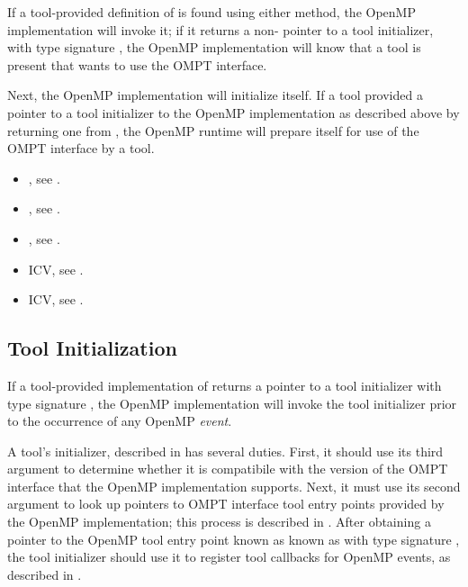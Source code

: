 If a tool-provided definition of  is found using
either method, the OpenMP implementation will invoke it; if it returns
a non- pointer to a tool initializer, with type signature
, the OpenMP implementation will know
that a tool is present that wants to use the OMPT interface.

Next, the OpenMP implementation will initialize itself. If a tool
provided a pointer to a tool initializer to the OpenMP implementation
as described above by returning one from , the OpenMP
runtime will prepare itself for use of the OMPT interface by a tool. 

\crossreferences
\begin{itemize}
\item {}, see .
\item {}, see .
\item {}, see .
\item {} ICV, see .
\item {} ICV, see .
\end{itemize}

\subsection{Tool Initialization}
\label{sec:tool-initialize}

If a tool-provided implementation of  returns a
pointer to a tool initializer with type signature
,
the OpenMP implementation will invoke the tool initializer prior to
the occurrence of any OpenMP \emph{event}. 

A tool's initializer, described in 
has several duties.  First, it should use its third argument
 to determine whether it is compatibile with the
version of the OMPT interface that the OpenMP implementation supports.
Next, it must use its second argument  to look up pointers
to OMPT interface tool entry points provided by the OpenMP
implementation; this process is described in .
After obtaining a pointer to the OpenMP tool entry point known as
known as  with type signature
, the tool initializer should use it to
register tool callbacks for OpenMP events, as described in
.


